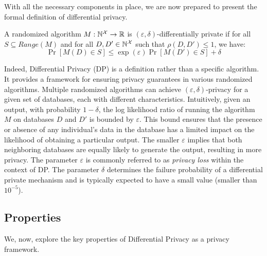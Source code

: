 With all the necessary components in place, we are now prepared to present the formal definition of differential privacy.
\begin{definition}
  \label{def:dp}
  A randomized algorithm $M: \mathbb{N}^\mathcal{X} \rightarrow \mathbb{R}$ is $(\varepsilon, \delta)$-differentially private if for all ${S} \subseteq Range(M)$ and for  all $D, D' \in \mathbb{N}^\mathcal{X}$ such that $\rho(D, D') \leq 1$, we have:
  \begin{equation*}
    \Pr[M(D) \in S] \leq \exp(\varepsilon)\Pr[M(D') \in S] + \delta
  \end{equation*}
\end{definition}
\noindent
Indeed, Differential Privacy (DP) is a definition rather than a specific algorithm.
It provides a framework for ensuring privacy guarantees in various randomized algorithms. Multiple randomized algorithms can achieve $(\varepsilon, \delta)$-privacy for a given set of databases, each with different characteristics. 
Intuitively, given an output, with probability $1-\delta$, the log likelihood ratio of running the algorithm $M$ on databases $D$ and $D'$ is bounded by $\varepsilon$.
This bound ensures that the presence or absence of any individual's data in the database has a limited impact on the likelihood of obtaining a particular output.
The smaller $\varepsilon$ implies that both neighboring databases are equally likely to generate the output, resulting in more privacy.
The parameter $\varepsilon$ is commonly referred to as \textit{privacy loss} within the context of DP.
The parameter $\delta$ determines the failure probability of a differential private mechanism and is typically expected to have a small value (\ie smaller than $10^{-5}$).


%
%

\subsection{Properties}\label{subsec:background-dp-properties}
We, now, explore the key properties of Differential Privacy as a privacy framework.


